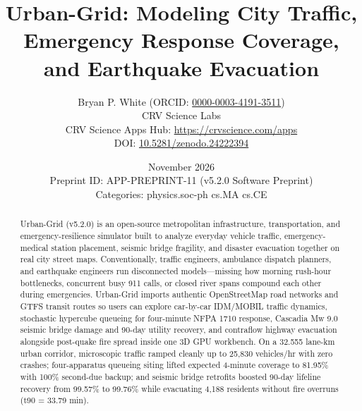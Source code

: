 \documentclass[10pt,letterpaper]{article}
\title{\textbf{Urban-Grid: Modeling City Traffic, Emergency Response Coverage, and Earthquake Evacuation}}
\author{Bryan P. White (ORCID: \href{https://orcid.org/0000-0003-4191-3511}{0000-0003-4191-3511}) \\ CRV Science Labs \\ \small CRV Science Apps Hub: \url{https://crvscience.com/apps} \\ \small DOI: \href{https://doi.org/10.5281/zenodo.24222394}{10.5281/zenodo.24222394}}
\date{November 2026 \\ \small Preprint ID: APP-PREPRINT-11 (v5.2.0 Software Preprint) \\ \small Categories: physics.soc-ph \textbullet{} cs.MA \textbullet{} cs.CE}
\begin{document}
\maketitle

\begin{abstract}
Urban-Grid (v5.2.0) is an open-source metropolitan infrastructure, transportation, and emergency-resilience simulator built to analyze everyday vehicle traffic, emergency-medical station placement, seismic bridge fragility, and disaster evacuation together on real city street maps. Conventionally, traffic engineers, ambulance dispatch planners, and earthquake engineers run disconnected models---missing how morning rush-hour bottlenecks, concurrent busy 911 calls, or closed river spans compound each other during emergencies. Urban-Grid imports authentic OpenStreetMap road networks and GTFS transit routes so users can explore car-by-car IDM/MOBIL traffic dynamics, stochastic hypercube queueing for four-minute NFPA 1710 response, Cascadia Mw 9.0 seismic bridge damage and 90-day utility recovery, and contraflow highway evacuation alongside post-quake fire spread inside one 3D GPU workbench. On a 32.555 lane-km urban corridor, microscopic traffic ramped cleanly up to 25,830 vehicles/hr with zero crashes; four-apparatus queueing siting lifted expected 4-minute coverage to 81.95\% with 100\% second-due backup; and seismic bridge retrofits boosted 90-day lifeline recovery from 99.57\% to 99.76\% while evacuating 4,188 residents without fire overruns (t90 = 33.79 min).
\end{abstract}
\end{document}
